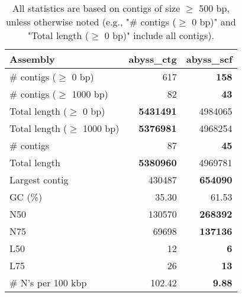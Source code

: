 \documentclass[12pt,a4paper]{article}
\begin{document}
\begin{table}[ht]
\begin{center}
\caption{All statistics are based on contigs of size $\geq$ 500 bp, unless otherwise noted (e.g., "\# contigs ($\geq$ 0 bp)" and "Total length ($\geq$ 0 bp)" include all contigs).}
\begin{tabular}{|l*{2}{|r}|}
\hline
Assembly & abyss\_ctg & abyss\_scf \\ \hline
\# contigs ($\geq$ 0 bp) & 617 & {\bf 158} \\ \hline
\# contigs ($\geq$ 1000 bp) & 82 & {\bf 43} \\ \hline
Total length ($\geq$ 0 bp) & {\bf 5431491} & 4984065 \\ \hline
Total length ($\geq$ 1000 bp) & {\bf 5376981} & 4968254 \\ \hline
\# contigs & 87 & {\bf 45} \\ \hline
Total length & {\bf 5380960} & 4969781 \\ \hline
Largest contig & 430487 & {\bf 654090} \\ \hline
GC (\%) & 35.30 & 61.53 \\ \hline
N50 & 130570 & {\bf 268392} \\ \hline
N75 & 69698 & {\bf 137136} \\ \hline
L50 & 12 & {\bf 6} \\ \hline
L75 & 26 & {\bf 13} \\ \hline
\# N's per 100 kbp & 102.42 & {\bf 9.88} \\ \hline
\end{tabular}
\end{center}
\end{table}
\end{document}

